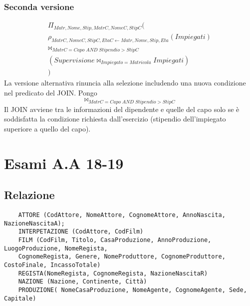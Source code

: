 \subsubsection*{Seconda versione}
\begin{align*}
	\Pi_{Matr,Nome,Stip,MatrC,NomeC,StipC}(\\
	\rho_{MatrC,NomeC,StipC,EtaC \leftarrow Matr,Nome,Stip,Eta}(Impiegati)\\\Join_{MatrC=Capo\;AND\;Stipendio>StipC}\\(Supervisione \Join_{Impiegato=Matricola} Impiegati)
	\\)
\end{align*}
La versione alternativa rinuncia alla selezione includendo una nuova condizione nel predicato del JOIN. Pongo
\[\Join_{MatrC=Capo\;AND\;Stipendio>StipC}\]
Il JOIN avviene tra le informazioni del dipendente e quelle del capo solo se è soddisfatta la condizione richiesta dall'esercizio (stipendio dell'impiegato superiore a quello del capo).


\section*{Esami A.A 18-19}
\subsection*{Relazione}
\begin{verbatim}
	ATTORE (CodAttore, NomeAttore, CognomeAttore, AnnoNascita, NazioneNascitaA);
	INTERPETAZIONE (CodAttore, CodFilm)
	FILM (CodFilm, Titolo, CasaProduzione, AnnoProduzione, LuogoProduzione, NomeRegista,
	CognomeRegista, Genere, NomeProduttore, CognomeProduttore, CostoFinale, IncassoTotale)
	REGISTA(NomeRegista, CognomeRegista, NazioneNascitaR)
	NAZIONE (Nazione, Continente, Città)
	PRODUZIONE( NomeCasaProduzione, NomeAgente, CognomeAgente, Sede, Capitale) 
\end{verbatim}
